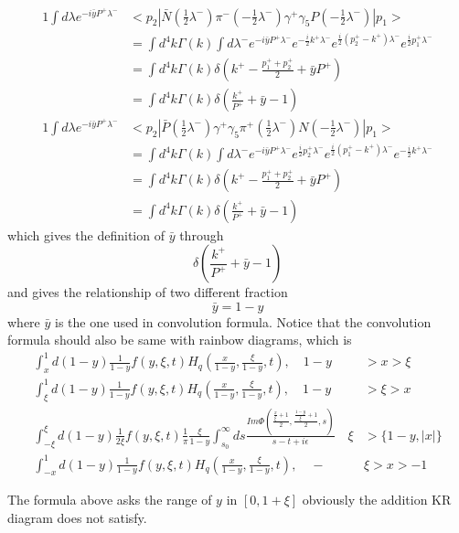 \documentclass[preprintnumbers,prd,superscriptaddress,preprint]{revtex4-1}
\begin{document}
	\begin{alignat*}{1}
		\int d\lambda e^{-i\bar{y}P^{+}\lambda^{-}} & <p_{2}|\bar{N}(\frac{1}{2}\lambda^{-})\pi^{-}(-\frac{1}{2}\lambda^{-})\gamma^{+}\gamma_{5}P(-\frac{1}{2}\lambda^{-})|p_{1}>\\
		& =\int d^{4}k\Gamma(k)\int d\lambda^{-}e^{-i\bar{y}P^{+}\lambda^{-}}e^{-\frac{i}{2}k^{+}\lambda^{-}}e^{\frac{i}{2}(p_{2}^{+}-k^{+})\lambda^{-}}e^{\frac{i}{2}p_{1}^{+}\lambda^{-}}\\
		& =\int d^{4}k\Gamma(k)\delta(k^{+}-\frac{p_{1}^{+}+p_{2}^{+}}{2}+\bar{y}P^{+})\\
		& =\int d^{4}k\Gamma(k)\delta(\frac{k^{+}}{P^{+}}+\bar{y}-1)
	\end{alignat*}
	\begin{alignat*}{1}
		\int d\lambda e^{-i\bar{y}P^{+}\lambda^{-}} & <p_{2}|\bar{P}(\frac{1}{2}\lambda^{-})\gamma^{+}\gamma_{5}\pi^{+}(\frac{1}{2}\lambda^{-})N(-\frac{1}{2}\lambda^{-})|p_{1}>\\
		& =\int d^{4}k\Gamma(k)\int d\lambda^{-}e^{-i\bar{y}P^{+}\lambda^{-}}e^{\frac{i}{2}p_{2}^{+}\lambda^{-}}e^{\frac{i}{2}(p_{1}^{+}-k^{+})\lambda^{-}}e^{-\frac{i}{2}k^{+}\lambda^{-}}\\
		& =\int d^{4}k\Gamma(k)\delta(k^{+}-\frac{p_{1}^{+}+p_{2}^{+}}{2}+\bar{y}P^{+})\\
		& =\int d^{4}k\Gamma(k)\delta(\frac{k^{+}}{P^{+}}+\bar{y}-1)
	\end{alignat*}
	which gives the definition of $\bar{y}$ through \[\delta(\frac{k^{+}}{P^{+}}+\bar{y}-1)\] and gives the relationship of two different fraction\[\bar{y}=1-y\] where $\bar{y}$ is the one used in convolution formula.
	Notice that the convolution formula should also be same with rainbow diagrams,
	which is 
	\begin{align*}
		\int_{x}^{1}d(1-y)\frac{1}{1-y}f(y,\xi,t)H_{q}(\frac{x}{1-y},\frac{\xi}{1-y},t),\quad1-y & >x>\xi\\
		\int_{\xi}^{1}d(1-y)\frac{1}{1-y}f(y,\xi,t)H_{q}(\frac{x}{1-y},\frac{\xi}{1-y},t),\quad1-y & >\xi>x\\
		\int_{-\xi}^{\xi}d(1-y)\frac{1}{2\xi}f(y,\xi,t)\frac{1}{\pi}\frac{\xi}{1-y}\int_{s_{0}}^{\infty}ds\frac{Im\Phi(\frac{\frac{x}{\xi}+1}{2},\frac{\frac{1-y}{\xi}+1}{2},s)}{s-t+i\epsilon}\quad\xi & >\{1-y,|x|\}\\
		\int_{-x}^{1}d(1-y)\frac{1}{1-y}f(y,\xi,t)H_{q}(\frac{x}{1-y},\frac{\xi}{1-y},t),\quad- & \xi>x>-1
	\end{align*}
	
	The formula above asks the range of $y$ in $[0,1+\xi]$ obviously
	the addition KR diagram does not satisfy. 
	
\end{document}

